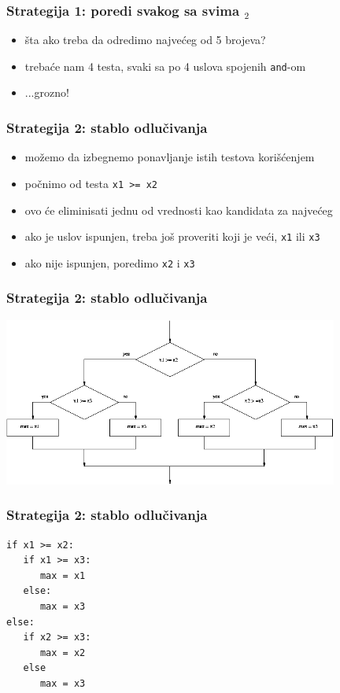 \documentclass[utf8,compress]{beamer}
\begin{document}
\begin{frame}[fragile]
  \frametitle{Strategija 1: poredi svakog sa svima $_2$}
  \begin{itemize}
    \item šta ako treba da odredimo najvećeg od 5 brojeva?
    \item trebaće nam 4 testa, svaki sa po 4 uslova spojenih \texttt{and}-om
    \item ...grozno!
  \end{itemize}
\end{frame}

\begin{frame}[fragile]
  \frametitle{Strategija 2: stablo odlučivanja}
  \begin{itemize}
    \item možemo da izbegnemo ponavljanje istih testova korišćenjem 
    \item počnimo od testa \texttt{x1 >= x2}
    \item ovo će eliminisati jednu od vrednosti kao kandidata za najvećeg
    \item ako je uslov ispunjen, treba još proveriti koji je veći, \texttt{x1} ili \texttt{x3}
    \item ako nije ispunjen, poredimo \texttt{x2} i \texttt{x3}
  \end{itemize}
\end{frame}

\begin{frame}[fragile]
  \frametitle{Strategija 2: stablo odlučivanja}
\begin{center}
  \includegraphics[width=11cm]{pic17}
\end{center}
\end{frame}

\begin{frame}[fragile]
  \frametitle{Strategija 2: stablo odlučivanja}
\begin{verbatim}
if x1 >= x2:
   if x1 >= x3:
      max = x1
   else:
      max = x3
else:
   if x2 >= x3:
      max = x2
   else
      max = x3
\end{verbatim}
\end{frame}
\end{document}
